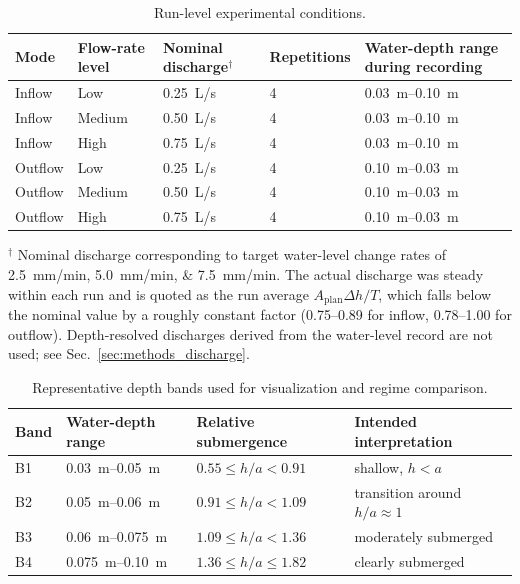 \begin{table}[tb]
\centering
\caption{Run-level experimental conditions.}
\label{tab:run_conditions}
\small
\begin{tabular}{lllll}
\hline
Mode & Flow-rate level & Nominal discharge$^\dagger$ & Repetitions & Water-depth range during recording \\
\hline
Inflow  & Low    & \SI{0.25}{L/s} & 4 & \SIrange{0.03}{0.10}{m} \\
Inflow  & Medium & \SI{0.50}{L/s} & 4 & \SIrange{0.03}{0.10}{m} \\
Inflow  & High   & \SI{0.75}{L/s} & 4 & \SIrange{0.03}{0.10}{m} \\
Outflow & Low    & \SI{0.25}{L/s} & 4 & \SIrange{0.10}{0.03}{m} \\
Outflow & Medium & \SI{0.50}{L/s} & 4 & \SIrange{0.10}{0.03}{m} \\
Outflow & High   & \SI{0.75}{L/s} & 4 & \SIrange{0.10}{0.03}{m} \\
\hline
\end{tabular}

\vspace{1mm}
\parbox{0.96\linewidth}{\footnotesize
$^\dagger$ Nominal discharge corresponding to target water-level change rates of
\SIlist{2.5;5.0;7.5}{mm/min}. The actual discharge was steady within each run
and is quoted as the run average $A_{\mathrm{plan}}\Delta h/T$, which falls
below the nominal value by a roughly constant factor (0.75--0.89 for inflow,
0.78--1.00 for outflow). Depth-resolved discharges derived from the water-level
record are not used; see Sec.~\ref{sec:methods_discharge}.
}
\end{table}


\begin{table}[tb]
\centering
\caption{Representative depth bands used for visualization and regime comparison.}
\label{tab:depth_bands}
\small
\begin{tabular}{llll}
\hline
Band & Water-depth range & Relative submergence & Intended interpretation \\
\hline
B1 & \SIrange{0.03}{0.05}{m}   & $0.55 \le h/a < 0.91$ & shallow, $h<a$ \\
B2 & \SIrange{0.05}{0.06}{m}   & $0.91 \le h/a < 1.09$ & transition around $h/a \approx 1$ \\
B3 & \SIrange{0.06}{0.075}{m}  & $1.09 \le h/a < 1.36$ & moderately submerged \\
B4 & \SIrange{0.075}{0.10}{m}  & $1.36 \le h/a \le 1.82$ & clearly submerged \\
\hline
\end{tabular}
\end{table}

